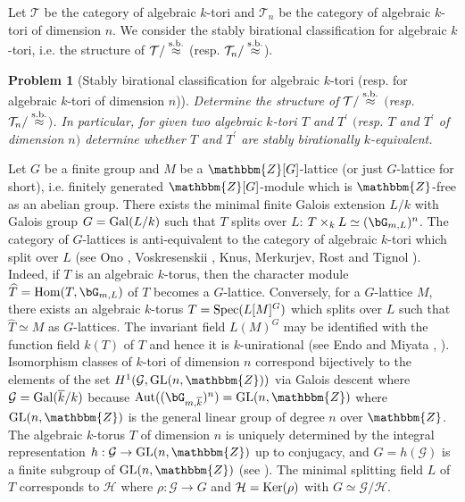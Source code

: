 \documentclass{amsart}
\theoremstyle{plain}
\newtheorem{problem}[theorem]{Problem}
\theoremstyle{definition}
\theoremstyle{remark}
\newcommand{\bZ}{\mathbbm{Z}}\newcommand{\bQ}{\mathbbm{Q}}
\newcommand{\GL}{{\rm GL}}\newcommand{\SL}{{\rm SL}}
\newcounter{sub}\def\tr{\mbox{tr }}
\begin{document}
Let $\mathcal{T}$ be the category of algebraic $k$-tori and 
$\mathcal{T}_n$ be the category of algebraic $k$-tori of dimension $n$. 
%
We consider the stably birational classification for algebraic $k$-tori, 
i.e. the structure of $\mathcal{T}/\stackrel{\rm s.b.}{\approx}$ 
(resp. $\mathcal{T}_n/\stackrel{\rm s.b.}{\approx}$). 
%
\begin{problem}[Stably birational classification for algebraic $k$-tori (resp. for algebraic $k$-tori of dimension $n$)]\label{prob1.3}
Determine the structure of $\mathcal{T}/\stackrel{\rm s.b.}{\approx}$ 
$($resp. $\mathcal{T}_n/\stackrel{\rm s.b.}{\approx}$$)$. 
In particular, 
for given two algebraic $k$-tori $T$ and $T^\prime$ 
$($resp. $T$ and $T^\prime$ of dimension $n$$)$ 
determine whether $T$ and $T^\prime$ are stably birationally $k$-equivalent. 
\end{problem}


Let $G$ be a finite group and 
$M$ be a $\bZ[G]$-lattice (or just $G$-lattice for short), 
i.e. finitely generated $\bZ[G]$-module which is $\bZ$-free 
as an abelian group. 
%
There exists the minimal finite Galois extension $L/k$ 
with Galois group $G={\rm Gal}(L/k)$ such that 
$T$ splits over $L$: $T\times_k L\simeq (\bG_{m,L})^n$. 
The category of $G$-lattices is anti-equivalent to the category of 
algebraic $k$-tori which split over $L$ 
(see Ono \cite[Section 1.2]{Ono61}, 
Voskresenskii \cite[page 27, Example 6]{Vos98}, 
Knus, Merkurjev, Rost and Tignol \cite[Proposition 20.17]{KMRT98}). 
Indeed, if $T$ is an algebraic $k$-torus, then the character module 
$\widehat{T}={\rm Hom}(T,\bG_{m,L})$ of $T$ becomes a $G$-lattice. 
Conversely, for a $G$-lattice $M$, there exists an algebraic $k$-torus 
$T={\rm Spec}(L[M]^G)$ which splits over $L$ such that 
$\widehat{T}\simeq M$ as $G$-lattices. 
The invariant field $L(M)^G$ may be identified with the function field 
$k(T)$ of $T$ 
and hence it is $k$-unirational (see Endo and Miyata \cite{EM75}, 
\cite[page 40, Example 21]{Vos98}).
Isomorphism classes of $k$-tori of dimension $n$ %
correspond bijectively to the elements of 
the set $H^1(\mathcal{G},\GL(n,\bZ))$ via Galois descent 
where $\mathcal{G}={\rm Gal}(\overline{k}/k)$ because 
${\rm Aut}((\bG_{m,\overline{k}})^n)=\GL(n,\bZ)$ 
where $\GL(n,\bZ)$ is the general linear group of degree $n$ over $\bZ$. 
The algebraic $k$-torus $T$ of dimension $n$ 
is uniquely determined by the integral representation 
$h : \mathcal{G}\rightarrow \GL(n,\bZ)$ up to conjugacy, 
and $G=h(\mathcal{G})$ is a finite subgroup of $\GL(n,\bZ)$ 
(see \cite[page 57, Section 4.9]{Vos98}). 
The minimal splitting field $L$ of $T$ corresponds to 
$\mathcal{H}$ where 
$\rho: \mathcal{G}\rightarrow G$ and $\mathcal{H}={\rm Ker}(\rho)$ 
with $G\simeq \mathcal{G}/\mathcal{H}$. \\
\end{document}
